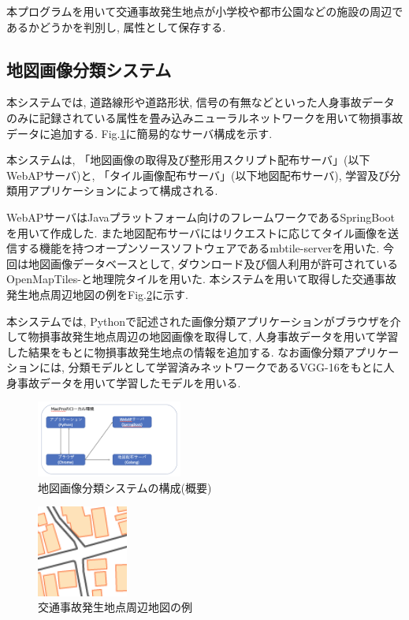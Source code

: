 \documentclass[a4j,8.5pt, twocolumn,fleqn]{jbook}
\begin{document}
本プログラムを用いて交通事故発生地点が小学校や都市公園などの施設の周辺であるかどうかを判別し, 属性として保存する. 

\subsection{地図画像分類システム}
本システムでは, 道路線形や道路形状, 信号の有無などといった人身事故データのみに記録されている属性を畳み込みニューラルネットワークを用いて物損事故データに追加する. Fig.\ref{classifications}に簡易的なサーバ構成を示す. 

本システムは, 「地図画像の取得及び整形用スクリプト配布サーバ」(以下WebAPサーバ)と, 「タイル画像配布サーバ」(以下地図配布サーバ), 学習及び分類用アプリケーションによって構成される. 

WebAPサーバはJavaプラットフォーム向けのフレームワークであるSpringBootを用いて作成した. また地図配布サーバにはリクエストに応じてタイル画像を送信する機能を持つオープンソースソフトウェアであるmbtile-server\cite{mbtile-server}を用いた. 
今回は地図画像データベースとして, ダウンロード及び個人利用が許可されているOpenMapTiles-\cite{openmaptiles}と地理院タイル\cite{tiriixn_tile}を用いた. 
本システムを用いて取得した交通事故発生地点周辺地図の例をFig.\ref{tiriixn}に示す. 

本システムでは, Pythonで記述された画像分類アプリケーションがブラウザを介して物損事故発生地点周辺の地図画像を取得して, 人身事故データを用いて学習した結果をもとに物損事故発生地点の情報を追加する. 
なお画像分類アプリケーションには, 分類モデルとして学習済みネットワークであるVGG-16をもとに人身事故データを用いて学習したモデルを用いる. 

\begin{figure}[htb]
    \centering
    \includegraphics[height=25mm]{images/mapclassification_server.png}
    \vspace{-3mm}
    \caption{地図画像分類システムの構成(概要)}
    \label{classifications}
\end{figure}

\begin{figure}[htb]
    \centering
    \includegraphics[height=30mm]{images/tiriixn.png}
    \vspace{-3mm}
    \caption{交通事故発生地点周辺地図の例}
    \label{tiriixn}
\end{figure}
\end{document}
